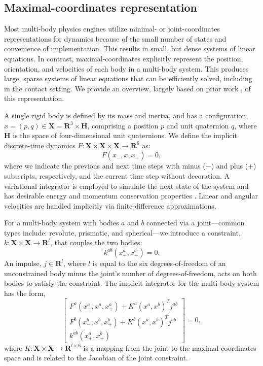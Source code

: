 \subsection{Maximal-coordinates representation} 
Most multi-body physics engines utilize minimal- or joint-coordinates representations for dynamics because of the small number of states and convenience of implementation. This results in small, but dense systems of linear equations. In contrast, maximal-coordinates explicitly represent the position, orientation, and velocities of each body in a multi-body system. This produces large, sparse systems of linear equations that can be efficiently solved, including in the contact setting. We provide an overview, largely based on prior work \cite{brudigam2020linear}, of this representation. 

A single rigid body is defined by its mass and inertia, and has a configuration, $x = (p, q) \in \mathbf{X} = \mathbf{R}^3 \times \mathbf{H}$, comprising a position $p$ and unit quaternion $q$, where $\mathbf{H}$ is the space of four-dimensional unit quaternions. We define the implicit discrete-time dynamics $F : \mathbf{X} \times \mathbf{X} \times \mathbf{X} \rightarrow \mathbf{R}^{6}$ as: 
\begin{equation}
	F(x_{-}, x, x_{+}) = 0, \label{dojo_implicit_dynamics}
\end{equation}
where we indicate the previous and next time steps with minus ($-$) and plus ($+$) subscripts, respectively, and the current time step without decoration.
A variational integrator is employed to simulate the next state of the system and has desirable energy and momentum conservation properties \cite{marsden2001discrete}. Linear and angular velocities are handled implicitly via finite-difference approximations.

For a multi-body system with bodies $a$ and $b$ connected via a joint---common types include: revolute, prismatic, and spherical---we introduce a constraint, $k : \mathbf{X} \times \mathbf{X} \rightarrow \mathbf{R}^{l}$, that couples the two bodies: 
\begin{equation} 
	k^{ab}(x^{a}_{+}, x^{b}_{+}) = 0. 
\end{equation} 
An impulse, $j \in \mathbf{R}^l$, where $l$ is equal to the six degrees-of-freedom of an unconstrained body minus the joint's number of degrees-of-freedom, acts on both bodies to satisfy the constraint. The implicit integrator for the multi-body system has the form,
\begin{equation} 
	\begin{bmatrix} 
		F^{a}(x^{a}_{-}, x^{a}, x^{a}_{+}) + K^{a}(x^{a}, x^{b})^T j^{ab} \\ 
		F^{b}(x^{b}_{-}, x^{b}, x^{b}_{+}) + K^{b}(x^{a}, x^{b})^T j^{ab} \\ 
		k^{ab}(x^{a}_{+}, x^{b}_{+})
	\end{bmatrix} = 0, \label{dojo_max_2body}
\end{equation}
where $K: \mathbf{X} \times \mathbf{X} \rightarrow \mathbf{R}^{l \times 6}$ is a mapping from the joint to the maximal-coordinates space and is related to the Jacobian of the joint constraint.

